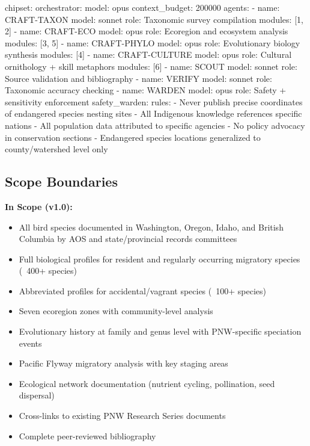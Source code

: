 \documentclass[11pt,letterpaper]{article}
\begin{document}
\begin{asciibox}
chipset:
  orchestrator:
    model: opus
    context_budget: 200000
  agents:
    - name: CRAFT-TAXON
      model: sonnet
      role: Taxonomic survey compilation
      modules: [1, 2]
    - name: CRAFT-ECO
      model: opus
      role: Ecoregion and ecosystem analysis
      modules: [3, 5]
    - name: CRAFT-PHYLO
      model: opus
      role: Evolutionary biology synthesis
      modules: [4]
    - name: CRAFT-CULTURE
      model: opus
      role: Cultural ornithology + skill metaphors
      modules: [6]
    - name: SCOUT
      model: sonnet
      role: Source validation and bibliography
    - name: VERIFY
      model: sonnet
      role: Taxonomic accuracy checking
    - name: WARDEN
      model: opus
      role: Safety + sensitivity enforcement
  safety_warden:
    rules:
      - Never publish precise coordinates of endangered
        species nesting sites
      - All Indigenous knowledge references specific nations
      - All population data attributed to specific agencies
      - No policy advocacy in conservation sections
      - Endangered species locations generalized to
        county/watershed level only
\end{asciibox}

\subsection{Scope Boundaries}

\textbf{In Scope (v1.0):}
\begin{itemize}[leftmargin=2em]
\item All bird species documented in Washington, Oregon, Idaho, and British Columbia by AOS and state/provincial records committees
\item Full biological profiles for resident and regularly occurring migratory species (~400+ species)
\item Abbreviated profiles for accidental/vagrant species (~100+ species)
\item Seven ecoregion zones with community-level analysis
\item Evolutionary history at family and genus level with PNW-specific speciation events
\item Pacific Flyway migratory analysis with key staging areas
\item Ecological network documentation (nutrient cycling, pollination, seed dispersal)
\item Cross-links to existing PNW Research Series documents
\item Complete peer-reviewed bibliography
\end{itemize}
\end{document}
